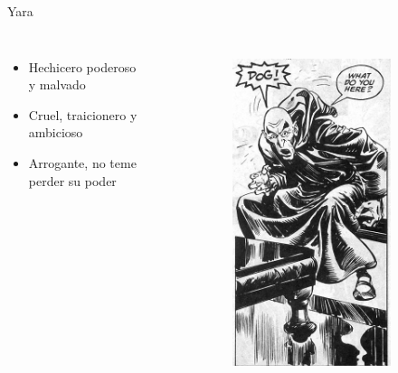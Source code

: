 \begin{frame}{Yara}
\begin{columns}
\begin{itemize}
 \item Hechicero poderoso y malvado
 \item Cruel, traicionero y ambicioso
 \item Arrogante, no teme perder su poder
\end{itemize}
\begin{figure}[htp]
 \centering
 \begin{subfigure}[b]{0.25\textwidth}
   \includegraphics[width=\textwidth]{img/yara/TSSC}

\end{subfigure}
\end{figure}
\end{columns}
\end{frame}
